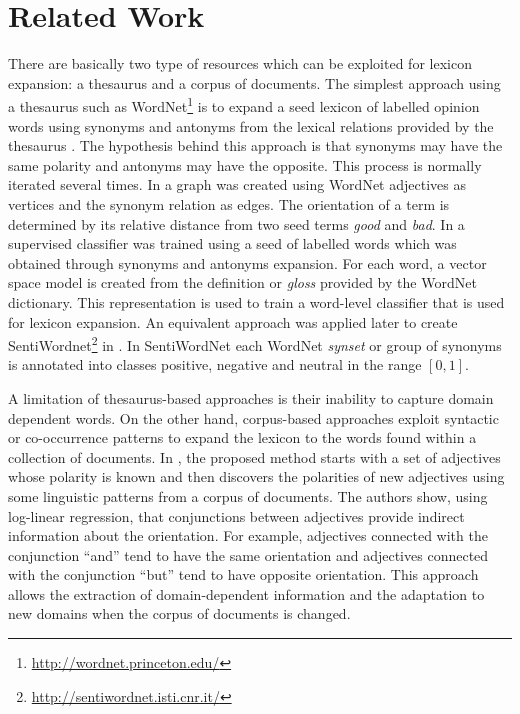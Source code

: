 \documentclass{sig-alternate}
\begin{document}
\section{Related Work}\label{sec:related}
There are basically two type of resources which can be exploited for lexicon expansion: a  thesaurus and a corpus of documents. The simplest approach using a thesaurus such as WordNet\footnote{\url{http://wordnet.princeton.edu/}} is to expand a seed lexicon of labelled opinion words using synonyms and antonyms from the lexical relations provided by the thesaurus 
\cite{Liu2004,Kim2004}. The hypothesis behind this approach is that synonyms may have the same polarity and antonyms may have the opposite. This process is normally iterated several times.
In \cite{kamps2004} a graph was created using WordNet adjectives as vertices and the synonym relation as edges. The orientation of a term is determined by its relative distance from two seed terms \emph{good} and \emph{bad}. In \cite{Esuli2005} a supervised classifier was trained using a seed of labelled words which was obtained through synonyms and antonyms expansion. For each word, a vector space model is created from the definition or \emph{gloss} provided by the WordNet dictionary. This representation is used to train a word-level classifier that is used for lexicon expansion. An equivalent approach was applied later to create SentiWordnet\footnote{\url{http://sentiwordnet.isti.cnr.it/}} in \cite{esuli2006, Baccianella2010}. In SentiWordNet each WordNet \emph{synset} or group of synonyms is  annotated into classes positive, negative and neutral in the range $[0,1]$.    

A limitation of thesaurus-based approaches is their inability to capture domain dependent words. On the other hand, corpus-based approaches exploit syntactic or co-occurrence patterns to expand the lexicon to the words found within a collection of documents. 
In \cite{Hatziva1997}, the proposed method starts with a set of adjectives whose polarity is known and then discovers the polarities of new adjectives using some linguistic patterns from a corpus of documents. The authors show, using log-linear regression, that conjunctions between adjectives provide indirect information about the orientation. For example, adjectives connected with the conjunction ``and'' tend to have the same orientation and adjectives connected with the conjunction ``but'' tend to have opposite orientation. This approach allows the extraction of domain-dependent information and the adaptation to new domains when the corpus of documents is changed. 
\end{document}
